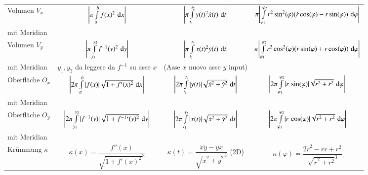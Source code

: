 {\begin{tabular}{| l | c | c | c |}
	\hline
	Volumen $V_x$ 		& $\Bigg| \pi \int \limits_a^b f(x) ^2 \, \mathop{} \! \mathrm{d} x \Bigg|$ 														& $\Bigg| \pi \int \limits_{t_1}^{t_2} y(t)^2 \dot{x}(t) \, \mathop{} \! \mathrm{d} t \Bigg|$ 															& $\pi \Bigg| \int \limits_{\varphi_1}^{\varphi_2} r^2 \sin^2(\varphi) (\dot{r} \cos(\varphi) - r \sin(\varphi)) \, \mathop{} \! \mathrm{d} \varphi \Bigg|$ 									\\
	mit Meridian 		& 																												& 																																		& 																																											\\
	\hline
	Volumen $V_y$ 		& $\Bigg| \pi \int \limits_{y_1}^{y_2} f^{-1}(y)^2 \, \mathop{} \! \mathrm{d} y \Bigg|$ 											& $\Bigg| \pi \int \limits_{t_1}^{t_2} x(t)^2 \dot{y}(t) \, \mathop{} \! \mathrm{d} t \Bigg|$ 															& $\pi \Bigg| \int \limits_{\varphi_1}^{\varphi_2} r^2 \cos^2(\varphi) (\dot{r} \sin(\varphi) + r \cos(\varphi)) \, \mathop{} \! \mathrm{d} \varphi \Bigg|$ 									\\
	mit Meridian 		& $y_1, y_2$ da leggere da $f^{-1}$ su asse $x$																	& (Asse $x$ nuovo asse $y$ input) 																																		& 																																											\\
	\hline
	Oberfläche $O_x$	& $\Bigg| 2 \pi \int \limits_a^b \vert f(x) \vert \sqrt{1 + f'(x)^2} \, \mathop{} \! \mathrm{d} x \Bigg|$							& $\Bigg| 2 \pi \int \limits_{t_1}^{t_2} \vert y(t) \vert \sqrt{\dot{x}^2 + \dot{y}^2} \, \mathop{} \! \mathrm{d} t \Bigg|$ 								& $\Bigg| 2 \pi \int \limits_{\varphi_1}^{\varphi_2} \vert r \, \sin(\varphi) \vert \sqrt{r^2 + \dot{r}^2} \, \mathop{} \! \mathrm{d} \varphi \Bigg|$											\\
	mit Meridian 		& 																												& 																																		& 																																											\\
	\hline
	Oberfläche $O_y$ 	& $\Bigg| 2 \pi \int \limits_{y_1}^{y_2} \vert f^{-1}(y) \vert \sqrt{1 + f^{-1}{'}(y)^2} \, \mathop{} \! \mathrm{d} y \Bigg|$		& $\Bigg| 2\pi \int \limits_{t_1}^{t_2} \vert x(t) \vert \sqrt{\dot{x}^2 + \dot{y}^2} \, \mathop{} \! \mathrm{d} t \Bigg|$ 								& $\Bigg| 2  \pi \int \limits_{\varphi_1}^{\varphi_2} \vert r \, \cos(\varphi) \vert \sqrt{\dot{r}^2 + r^2} \, \mathop{} \! \mathrm{d} \varphi \Bigg|$ 										\\
	mit Meridian 		& 																	&  																																		& 																																											\\
	\hline
	Krümmung $\kappa$ 	& $\kappa(x) = \dfrac{f''(x)}{\sqrt{1 + f'(x)^2}^3}$ 															& $\kappa(t) = \dfrac{\dot{x} \ddot{y} - \dot{y} \ddot{x}}{\sqrt{\dot{x}^2 + \dot{y}^2}^3}$ (2D) 										& $\kappa(\varphi) = \dfrac{2 \dot{r}^2 - r \ddot{r} +r^2}{\sqrt{\dot{r}^2 + r^2}^3}$																						\\

\end{tabular}}
